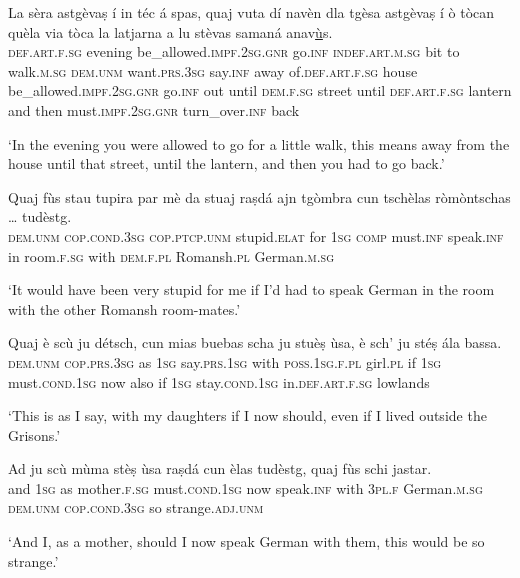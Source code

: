 \begin{linenumbers}
\gll    La sèra astgèvaṣ í in téc á spas, quaj vuta dí navèn dla tgèsa astgèvaṣ í ò tòcan quèla via tòca la latjarna a lu stèvas samaná anav\underline{ù}s.\\
 \textsc{def.art.f.sg} evening be\_allowed.\textsc{impf.2sg.gnr} go.\textsc{inf} \textsc{indef.art.m.sg} bit to walk.\textsc{m.sg} \textsc{dem.unm} want.\textsc{prs.3sg} say.\textsc{inf} away of.\textsc{def.art.f.sg} house be\_allowed.\textsc{impf.2sg.gnr} go.\textsc{inf} out until \textsc{dem.f.sg} street until \textsc{def.art.f.sg} lantern and then must.\textsc{impf.2sg.gnr} turn\_over.\textsc{inf} back\\
\end{linenumbers}
\medskip
\glt `In the evening you were allowed to go for a little walk, this means away from the house until that street, until the lantern, and then you had to go back.'
\medskip

\begin{linenumbers}
\gll    Quaj fùs stau tupira par mè da stuaj raṣdá ajn tgòmbra cun tschèlas ròmòntschas … tudèstg.\\
 \textsc{dem.unm} \textsc{cop.cond.3sg} \textsc{cop.ptcp.unm} stupid.\textsc{elat}  for \textsc{1sg} \textsc{comp} must.\textsc{inf} speak.\textsc{inf} in room.\textsc{f.sg} with \textsc{dem.f.pl} Romansh.\textsc{pl} {} German.\textsc{m.sg}\\
\end{linenumbers}
\medskip
\glt `It would have been very stupid for me if I'd had to speak German in the room with the other Romansh room-mates.'
\medskip

\begin{linenumbers}
\gll    Quaj è scù ju détsch, cun mias buebas scha ju stuèṣ ùsa, è sch’ ju stéṣ ála bassa.\\
 \textsc{dem.unm} \textsc{cop.prs.3sg} as \textsc{1sg} say.\textsc{prs.1sg} with \textsc{poss.1sg.f.pl} girl.\textsc{pl} if \textsc{1sg} must.\textsc{cond.1sg} now also if \textsc{1sg} stay.\textsc{cond.1sg} in.\textsc{def.art.f.sg} lowlands\\
\end{linenumbers}
\medskip
\glt `This is as I say, with my daughters if I now should, even if I lived outside the Grisons.'
\medskip

\begin{linenumbers}
\gll    Ad ju scù mùma stèṣ ùsa raṣdá cun èlas tudèstg, quaj fùs schi jastar.\\
and \textsc{1sg} as mother.\textsc{f.sg} must.\textsc{cond.1sg} now speak.\textsc{inf} with \textsc{3pl.f} German.\textsc{m.sg} \textsc{dem.unm} \textsc{cop.cond.3sg} so strange.\textsc{adj.unm}\\
\end{linenumbers}
\medskip
\glt `And I, as a mother, should I now speak German with them, this would be so strange.'
\medskip

